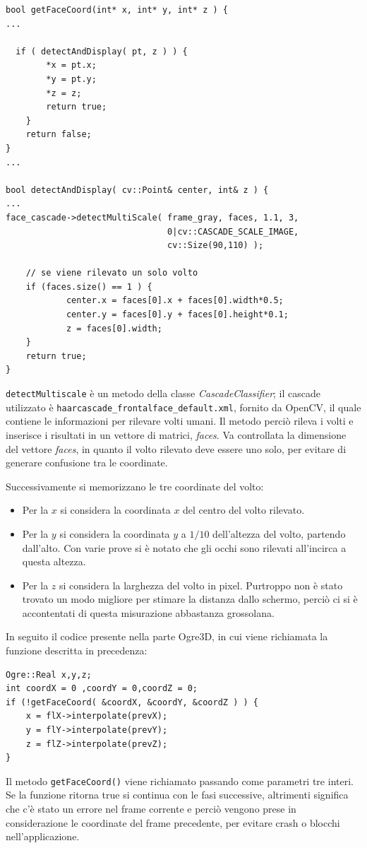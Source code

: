 \begin{lstlisting}
bool getFaceCoord(int* x, int* y, int* z ) {
...

  if ( detectAndDisplay( pt, z ) ) {
        *x = pt.x;
        *y = pt.y;
        *z = z;
        return true;
    } 
    return false;
}
...

bool detectAndDisplay( cv::Point& center, int& z ) {
...
face_cascade->detectMultiScale( frame_gray, faces, 1.1, 3,
                                0|cv::CASCADE_SCALE_IMAGE, 
                                cv::Size(90,110) );
    
    // se viene rilevato un solo volto
    if (faces.size() == 1 ) { 
            center.x = faces[0].x + faces[0].width*0.5;
            center.y = faces[0].y + faces[0].height*0.1;
            z = faces[0].width;
    }
    return true;
}
\end{lstlisting}
\texttt{detectMultiscale} è un metodo della classe \textit{CascadeClassifier}; il cascade utilizzato è \texttt{haarcascade\_frontalface\_default.xml}, fornito da OpenCV, il quale contiene le informazioni per rilevare volti umani. Il metodo perciò rileva i volti e inserisce i risultati in un vettore di matrici, \textit{faces}. Va controllata la dimensione del vettore \textit{faces}, in quanto il volto rilevato deve essere uno solo, per evitare di generare confusione tra le coordinate.

Successivamente si memorizzano le tre coordinate del volto:
\begin{itemize}

\item Per la $x$ si considera la coordinata $x$ del centro del volto rilevato.
\item Per la $y$ si considera la coordinata $y$ a $1/10$ dell'altezza del volto, partendo dall'alto. Con varie prove si è notato che gli occhi sono rilevati all'incirca a questa altezza.
\item Per la $z$ si considera la larghezza del volto in pixel. Purtroppo non è stato trovato un modo migliore per stimare la distanza dallo schermo, perciò ci si è accontentati di questa misurazione abbastanza grossolana.  
\end{itemize}


In seguito il codice presente nella parte Ogre3D, in cui viene richiamata la funzione descritta in precedenza:
\begin{lstlisting}
Ogre::Real x,y,z;
int coordX = 0 ,coordY = 0,coordZ = 0;
if (!getFaceCoord( &coordX, &coordY, &coordZ ) ) {
    x = flX->interpolate(prevX);
    y = flY->interpolate(prevY);
    z = flZ->interpolate(prevZ);
}
\end{lstlisting}
Il metodo \texttt{getFaceCoord()} viene richiamato passando come parametri tre interi. Se la funzione ritorna true si continua con le fasi successive, altrimenti significa che c'è stato un errore nel frame corrente e perciò vengono prese in considerazione le coordinate del frame precedente, per evitare crash o blocchi nell'applicazione.

